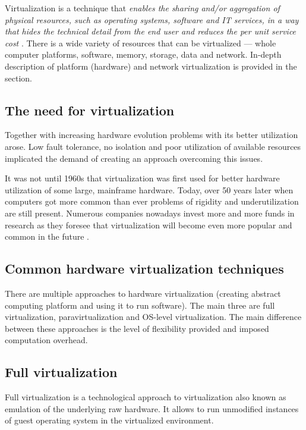 \documentclass[11pt,openany]{book}
\begin{document}
      Virtualization is a technique that \textit{enables the sharing and/or aggregation of physical resources, such as
      operating systems, software and IT services, in a way that hides the technical detail from the end user and
      reduces the per unit service cost} \cite{turban}. There is a wide variety of resources that can be virtualized ---
      whole computer platforms, software, memory, storage, data and network. In-depth description of platform (hardware)
      and network virtualization is provided in the section.


      \subsection{The need for virtualization}

        Together with increasing hardware evolution problems with its better utilization arose. Low fault tolerance, no
        isolation and poor utilization of available resources implicated the demand of creating an approach overcoming
        this issues. 

        It was not until 1960s that virtualization was first used for better hardware utilization of some large,
        mainframe hardware. Today, over 50 years later when computers got more common than ever problems of rigidity and
        underutilization are still present. Numerous companies nowadays invest more and more funds in research as they
        foresee that virtualization will become even more popular and common in the future \cite{virtualization}.


      \subsection{Common hardware virtualization techniques}

        There are multiple approaches to hardware virtualization (creating abstract computing platform \cite{turban} and
        using it to run software). The main three are full virtualization, paravirtualization and OS-level
        virtualization. The main difference between these approaches is the level of flexibility provided and imposed
        computation overhead.


      \subsection{Full virtualization}

        Full virtualization is a technological approach to virtualization also known as emulation of the underlying raw
        hardware. It allows to run unmodified instances of guest operating system in the virtualized environment. 
\end{document}
